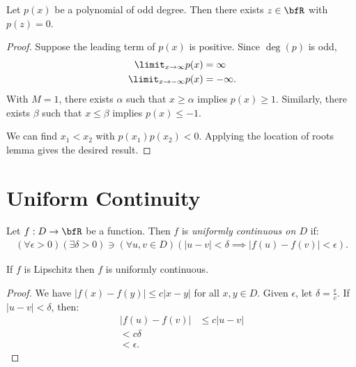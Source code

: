     \begin{corollary}
        Let $p(x)$ be a polynomial of odd degree. Then there exists $z \in \bfR$ with $p(z) = 0$.
    \end{corollary}
        \begin{proof}
            Suppose the leading term of $p(x)$ is positive. Since $\deg(p)$ is odd,
                \begin{equation*}
                \begin{split}
                    \limit_{x \rightarrow \infty}p(x) &= \infty \\
                    \limit_{x \rightarrow -\infty}p(x) &= -\infty.
                \end{split}
                \end{equation*}
            With $M=1$, there exists $\alpha$ such that $x \geq \alpha$ implies $p(x) \geq 1$. Similarly, there exists $\beta$ such that $x \leq \beta$ implies $p(x) \leq -1$. \nl
            
            We can find $x_1 < x_2$ with $p(x_1)p(x_2) < 0$. Applying the location of roots lemma gives the desired result.
        \end{proof}

\section{Uniform Continuity}
    \begin{definition}
        Let $f:D \rightarrow \bfR$ be a function. Then $f$ is \textit{uniformly continuous on $D$} if:
            \begin{equation*}
            \begin{split}
                (\forall \epsilon >0)(\exists \delta > 0) \ni (\forall u,v \in D)(|u-v| < \delta \implies |f(u) - f(v)| < \epsilon).
            \end{split}
            \end{equation*}
    \end{definition}

    \begin{proposition}
        If $f$ is Lipschitz then $f$ is uniformly continuous.
    \end{proposition}
        \begin{proof}
            We have $|f(x) - f(y)| \leq c|x-y|$ for all $x,y \in D$. Given $\epsilon$, let $\delta = \frac{\epsilon}{c}$. If $|u -v| < \delta$, then:
                \begin{equation*}
                \begin{split}
                    |f(u)-f(v)|
                    & \leq c|u-v| \\
                    <c \delta \\
                    < \epsilon.
                \end{split}
                \end{equation*}
        \end{proof}

